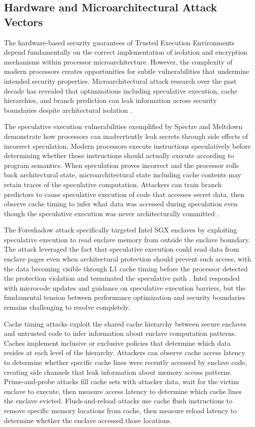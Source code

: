 \subsection{Hardware and Microarchitectural Attack Vectors}

The hardware-based security guarantees of Trusted Execution Environments depend fundamentally on the correct implementation of isolation and encryption mechanisms within processor microarchitecture. However, the complexity of modern processors creates opportunities for subtle vulnerabilities that undermine intended security properties. Microarchitectural attack research over the past decade has revealed that optimizations including speculative execution, cache hierarchies, and branch prediction can leak information across security boundaries despite architectural isolation \cite{spectre_meltdown}.

The speculative execution vulnerabilities exemplified by Spectre and Meltdown demonstrate how processors can inadvertently leak secrets through side effects of incorrect speculation. Modern processors execute instructions speculatively before determining whether those instructions should actually execute according to program semantics. When speculation proves incorrect and the processor rolls back architectural state, microarchitectural state including cache contents may retain traces of the speculative computation. Attackers can train branch predictors to cause speculative execution of code that accesses secret data, then observe cache timing to infer what data was accessed during speculation even though the speculative execution was never architecturally committed \cite{spectre_meltdown}.

The Foreshadow attack specifically targeted Intel SGX enclaves by exploiting speculative execution to read enclave memory from outside the enclave boundary. The attack leveraged the fact that speculative execution could read data from enclave pages even when architectural protection should prevent such access, with the data becoming visible through L1 cache timing before the processor detected the protection violation and terminated the speculative path \cite{foreshadow}. Intel responded with microcode updates and guidance on speculative execution barriers, but the fundamental tension between performance optimization and security boundaries remains challenging to resolve completely.

Cache timing attacks exploit the shared cache hierarchy between secure enclaves and untrusted code to infer information about enclave computation patterns. Caches implement inclusive or exclusive policies that determine which data resides at each level of the hierarchy. Attackers can observe cache access latency to determine whether specific cache lines were recently accessed by enclave code, creating side channels that leak information about memory access patterns. Prime-and-probe attacks fill cache sets with attacker data, wait for the victim enclave to execute, then measure access latency to determine which cache lines the enclave evicted. Flush-and-reload attacks use cache flush instructions to remove specific memory locations from cache, then measure reload latency to determine whether the enclave accessed those locations.


